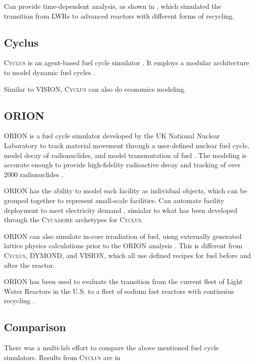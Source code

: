 \documentclass{article}
\newcommand{\Cyclus}{\textsc{Cyclus}\xspace}%
\newcommand{\Cycamore}{\textsc{Cycamore}\xspace}%
\begin{document}
    Can provide time-dependent analysis, as shown in \cite{piet_dynamic_2011}, 
    which simulated the transition from LWRs to advanced reactors with different 
    forms of recycling. 



    \subsection{Cyclus}
    \Cyclus is an agent-based fuel cycle simulator \cite{huff_fundamental_2016}. 
    It employs a modular architecture to model dynamic fuel cycles 
    \cite{huff_fundamental_2016}.

    Similar to VISION, \Cyclus can also do economics modeling. 

    

    \subsection{ORION}
    ORION is a fuel cycle simulator developed by the UK National Nuclear 
    Laboratory to track material movement through a user-defined nuclear 
    fuel cycle, model decay of radionuclides, and model transmutation of fuel
    \cite{gregg_analysis_2012}. The modeling is accurate enough to provide 
    high-fidelity radioactive decay and tracking of over 2000 radionuclides
    \cite{feng_standardized_2016}. 
    
    ORION has the ability to model each facility 
    as individual objects, which can be grouped together to represent small-scale 
    facilities. Can automate facility deployment to meet electricity demand
    \cite{feng_standardized_2016}, simialar to what has been developed through 
    the \Cycamore archetypes for \Cyclus \cite{scopatz_cyclus_2015}.  

    ORION can also simulate in-core irradiation of fuel, uisng externally 
    generated lattice physics calculations prior to the ORION analysis
    \cite{feng_standardized_2016}. This is different from \Cyclus, 
    DYMOND, and VISION, which all use defined recipes for fuel before 
    and after the reactor. 

    ORION has been used to evaluate the transition from the current fleet of 
    Light Water Reactors in the U.S. to a fleet of sodium fast reactors with 
    continuius recycling \cite{sunny_transition_2015}.

    
    \subsection{Comparison}
    There was a multi-lab effort to compare the above mentioned fuel cycle 
    simulators. Results from \Cyclus are in \cite{djokic_application_2015}
\end{document}

